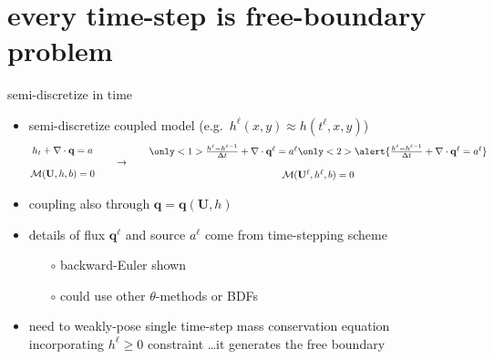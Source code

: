 \documentclass[xcolor={dvipsnames}]{beamer}
\newcommand\bq{\mathbf{q}}
\newcommand\bU{\mathbf{U}}
\newcommand\Div{\nabla\cdot}
\begin{document}
\section{every time-step is free-boundary problem}

\newcommand{\singletsmc}{\frac{h^\ell - h^{\ell-1}}{\Delta t} + \Div \bq^\ell = a^\ell}
\begin{frame}{semi-discretize in time}

\begin{itemize}
\item semi-discretize coupled model (e.g.~$h^\ell(x,y) \approx h(t^\ell,x,y)$)
$$\begin{matrix}
 h_t + \Div\bq = a \\
 \phantom{foo} \\
 \mathcal{M}(\bU,h,b) = 0
\end{matrix} \qquad \to \qquad \begin{matrix}
 \only<1>{\singletsmc} \only<2>{\alert{\singletsmc}} \\
 \phantom{foo} \\
 \mathcal{M}(\bU^\ell,h^\ell,b) = 0
\end{matrix}$$
\item coupling also through $\bq=\bq(\bU,h)$
\item details of flux $\bq^\ell$ and source $a^\ell$ come from time-stepping scheme
        \begin{itemize}
        \item[$\circ$] backward-Euler shown
        \item[$\circ$] could use other $\theta$-methods or BDFs
        \end{itemize}
\item<2> \alert{need to weakly-pose single time-step mass conservation equation incorporating $h^\ell\ge 0$ constraint \dots it generates the free boundary}
\end{itemize}
\end{frame}
\end{document}
